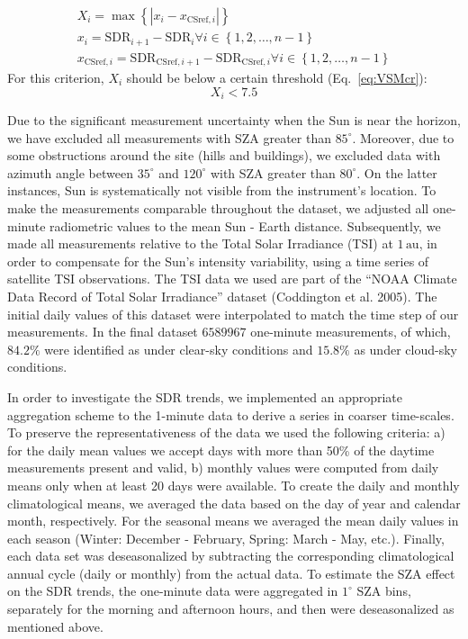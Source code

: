 \documentclass[
  preprint, 3p, authoryear]{article}
\begin{document}
\begin{enumerate}
  \begin{gather}
    X_i = \max{\left \{ \left | x_i - x_{\text{CSref},i} \right | \right \}} \label{eq:VSM3} \\
    x_i = \text{SDR}_{i+1} - \text{SDR}_{i} \forall i \in \left \{ 1, 2, \ldots, n-1 \right \} \label{eq:VSM1} \\
    x_{\text{CSref},i} = \text{SDR}_{\text{CSref},i+1} - \text{SDR}_{\text{CSref},i} \forall i \in \left \{ 1, 2, \ldots, n-1 \right \} \label{eq:VSM2}
  \end{gather}
  For this criterion, \(X_i\) should be below a certain threshold (Eq.~\ref{eq:VSMcr}):
  \begin{equation}
    X_i < 7.5 \label{eq:VSMcr}
  \end{equation}
\end{enumerate}

Due to the significant measurement uncertainty when the Sun is near the horizon, we have excluded all measurements with SZA greater than \(85^\circ\).
Moreover, due to some obstructions around the site (hills and buildings), we excluded data with azimuth angle between
\(35^\circ\) and \(120^\circ\) with SZA greater than \(80^\circ\).
On the latter instances, Sun is systematically not visible from the instrument's location.
To make the measurements comparable throughout the dataset, we adjusted all one-minute radiometric values to the mean Sun - Earth distance.
Subsequently, we made all measurements relative to the Total Solar Irradiance (TSI) at \(1\,\text{au}\), in order to compensate for the Sun's intensity variability, using a time series of satellite TSI observations.
The TSI data we used are part of the ``NOAA Climate Data Record of Total Solar Irradiance'' dataset (Coddington et al. 2005).
The initial daily values of this dataset were interpolated to match the time step of our measurements.
In the final dataset
\(6589967\)
one-minute measurements, of which,
\(84.2\%\)
were identified as under clear-sky conditions and
\(15.8\%\)
as under cloud-sky conditions.

In order to investigate the SDR trends, we implemented an appropriate aggregation scheme to the 1-minute data to derive a series in coarser time-scales.
To preserve the representativeness of the data we used the following criteria:
a) for the daily mean values we accept days with more than 50\% of the daytime measurements present and valid,
b) monthly values were computed from daily means
only when at least 20 days were available.
To create the daily and monthly climatological means, we averaged the data based on the day of year and calendar month, respectively.
For the seasonal means we averaged the mean daily values in each season (Winter: December - February, Spring: March - May, etc.).
Finally, each data set was deseasonalized by subtracting the corresponding climatological annual cycle (daily or monthly) from the actual data.
To estimate the SZA effect on the SDR trends, the one-minute data were aggregated in \(1^\circ\) SZA bins, separately for the morning and afternoon hours, and then were deseasonalized as mentioned above.
\end{document}
